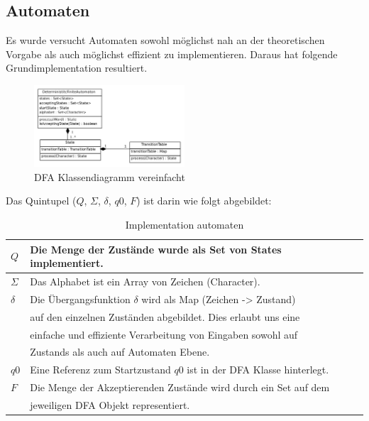 \subsection{Automaten}
Es wurde versucht Automaten sowohl möglichst nah an der theoretischen Vorgabe als auch möglichst effizient zu implementieren. Daraus hat folgende Grundimplementation resultiert.
\begin{figure}[h]
  \centering
  \includegraphics[width=0.5\textwidth]{images/dfa_classdiag_simple.pdf}
  \caption[DFA Klassendiagramm vereinfacht]{DFA Klassendiagramm vereinfacht}
  \label{fig:dfa_classdiag_simple}
\end{figure}

Das Quintupel ($Q$, $\Sigma$, $\delta$, $q0$, $F$) ist darin wie folgt abgebildet:

\begin{table}[h]
  \centering
  \begin{tabular}{ l | l }
    \hline
    $Q$ & Die Menge der Zustände wurde als Set von States implementiert.  \\
    \hline
    $\Sigma$ & Das Alphabet ist ein Array von Zeichen (Character). \\
    \hline
    $\delta$ & Die Übergangsfunktion $\delta$ wird als Map (Zeichen -> Zustand) 
    \\ & auf den einzelnen Zuständen abgebildet. Dies erlaubt uns eine
    \\ & einfache und effiziente Verarbeitung von Eingaben sowohl auf
    \\ & Zustands als auch auf Automaten Ebene. \\
    \hline
    $q0$ & Eine Referenz zum Startzustand $q0$ ist in der DFA Klasse hinterlegt. \\
    \hline
    $F$ & Die Menge der Akzeptierenden Zustände wird durch ein Set auf dem \\ & jeweiligen DFA Objekt representiert. \\
    \hline 
  \end{tabular}
  \caption[Implementation Automaten]{Implementation automaten}
\end{table}


